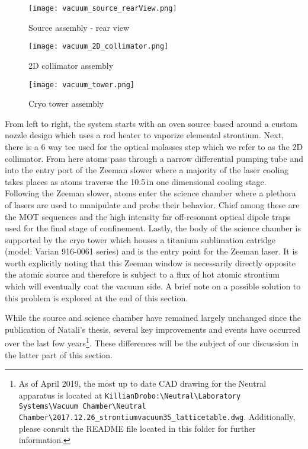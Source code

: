 	\begin{figure} 
		\centerline{
		\texttt{[image: vacuum\_source\_rearView.png]}}
		\caption{Source assembly - rear view}
		\label{fig:sourceRearView}
	\end{figure}
	
	\begin{figure} 
		\centerline{
		\texttt{[image: vacuum\_2D\_collimator.png]}}
		\caption{2D collimator assembly}
		\label{fig:assembly_2Dcoll}
	\end{figure}
	
	\begin{figure} 
		\centerline{
		\texttt{[image: vacuum\_tower.png]}}
		\caption{Cryo tower assembly}
		\label{fig:cryoTower}
	\end{figure}
From left to right, the system starts with an oven source based around a custom nozzle design which uses a rod heater to vaporize elemental strontium.
Next, there is a 6 way tee used for the optical molasses step which we refer to as the 2D collimator. 
From here atoms pass through a narrow differential pumping tube and into the entry port of the Zeeman slower where a majority of the laser cooling takes places as atoms traverse the 10.5\,in one dimensional cooling stage. 
Following the Zeeman slower, atoms enter the science chamber where a plethora of lasers are used to manipulate and probe their behavior.
Chief among these are the MOT sequences and the high intensity far off-resonant optical dipole traps used for the final stage of confinement.
Lastly, the body of the science chamber is supported by the cryo tower which houses a titanium sublimation catridge (model: Varian 916-0061 series) and is the entry point for the Zeeman laser.
It is worth explicitly noting that this Zeeman window is necessarily directly opposite the atomic source and therefore is subject to a flux of hot atomic strontium which will eventually coat the vacuum side. A brief note on a possible solution to this problem is explored at the end of this section.

While the source and science chamber have remained largely unchanged since the publication of Natali's thesis, several key improvements and events have occurred over the last few years\footnote{As of April 2019, the most up to date CAD drawing for the Neutral apparatus is located at \texttt{KillianDrobo:\textbackslash Neutral\textbackslash Laboratory Systems\textbackslash Vacuum Chamber\textbackslash Neutral Chamber\textbackslash 2017.12.26\_strontiumvacuum35\_latticetable.dwg}. Additionally, please consult the README file located in this folder for further information.}.
These differences will be the subject of our discussion in the latter part of this section.


